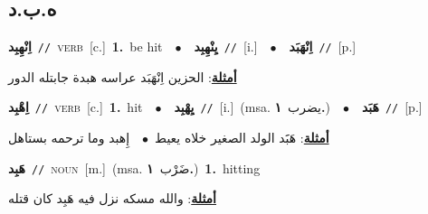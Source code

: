 \documentclass[10pt,a4paper,twoside]{article} %
\begin{document}
\begin{multicols}{2}
{\vspace{-3mm}
\subsection*{\color{blue}\foreignlanguage{arabic}{ه.ب.د}\color{blue}{}} 

{\setlength\topsep{0pt}\textbf{\foreignlanguage{arabic}{اِنْهِبِد}}\ {\color{gray}\texttt{//}\color{black}}\ \textsc{verb}\ [c.]\ \textbf{1.}~be hit\ \ $\bullet$\ \ \setlength\topsep{0pt}\textbf{\foreignlanguage{arabic}{يِنْهِبِد}}\ {\color{gray}\texttt{//}\color{black}}\ [i.]\ \ $\bullet$\ \ \setlength\topsep{0pt}\textbf{\foreignlanguage{arabic}{اِنْهَبَد}}\ {\color{gray}\texttt{//}\color{black}}\ [p.]\  \begin{flushright}\color{gray}\foreignlanguage{arabic}{\textbf{\underline{\foreignlanguage{arabic}{أمثلة}}}: الحزين اِنْهَبَد عراسه هبدة جابتله الدور}\end{flushright}\color{black}} \vspace{2mm}

{\setlength\topsep{0pt}\textbf{\foreignlanguage{arabic}{اِهْبِد}}\ {\color{gray}\texttt{//}\color{black}}\ \textsc{verb}\ [c.]\ \textbf{1.}~hit\ \ $\bullet$\ \ \setlength\topsep{0pt}\textbf{\foreignlanguage{arabic}{يِهْبِد}}\ {\color{gray}\texttt{//}\color{black}}\ [i.]\ \color{gray}(msa. \foreignlanguage{arabic}{يضرب}~\foreignlanguage{arabic}{\textbf{١.}})\color{black}\ \ $\bullet$\ \ \setlength\topsep{0pt}\textbf{\foreignlanguage{arabic}{هَبَد}}\ {\color{gray}\texttt{//}\color{black}}\ [p.]\  \begin{flushright}\color{gray}\foreignlanguage{arabic}{\textbf{\underline{\foreignlanguage{arabic}{أمثلة}}}: هَبََد الولد الصغير خلاه يعيط\ $\bullet$\ \  إِهبد وما ترحمه بستاهل}\end{flushright}\color{black}} \vspace{2mm}

{\setlength\topsep{0pt}\textbf{\foreignlanguage{arabic}{هَبِد}}\ {\color{gray}\texttt{//}\color{black}}\ \textsc{noun}\ [m.]\ \color{gray}(msa. \foreignlanguage{arabic}{ضَرْب}~\foreignlanguage{arabic}{\textbf{١.}})\color{black}\ \textbf{1.}~hitting\  \begin{flushright}\color{gray}\foreignlanguage{arabic}{\textbf{\underline{\foreignlanguage{arabic}{أمثلة}}}: والله مسكه نزل فيه هَبِد كان قتله}\end{flushright}\color{black}} \vspace{2mm}

}
\end{multicols}
\end{document}
